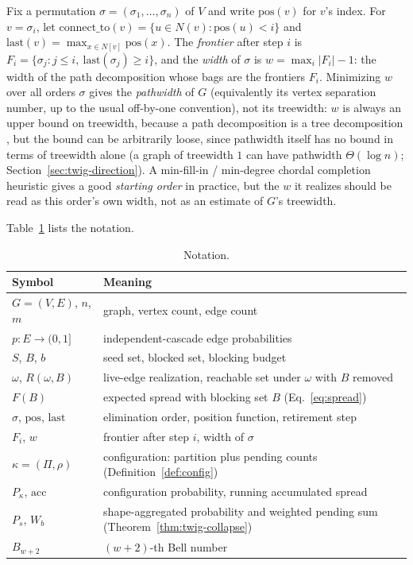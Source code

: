 \documentclass[11pt]{article}
\theoremstyle{definition}
\theoremstyle{remark}
\newcommand{\up}{\rule{0pt}{2.6ex}}
\newcommand{\down}{\rule[-1.2ex]{0pt}{0pt}}
\newcommand{\Rspread}{R}
\newcommand{\FF}{F}
\begin{document}
Fix a
permutation $\sigma=(\sigma_1,\dots,\sigma_n)$ of $V$ and write
$\mathrm{pos}(v)$ for $v$'s index. For $v=\sigma_i$, let
$\mathrm{connect\_to}(v)=\{u\in N(v):\mathrm{pos}(u)<i\}$ and
$\mathrm{last}(v)=\max_{x\in N[v]}\mathrm{pos}(x)$. The \emph{frontier}
after step $i$ is $F_i=\{\sigma_j:j\le i,\ \mathrm{last}(\sigma_j)\ge i\}$,
and the \emph{width} of $\sigma$ is $w=\max_i|F_i|-1$: the width of the path decomposition whose bags are the frontiers $F_i$. Minimizing $w$ over all orders $\sigma$
gives the \emph{pathwidth} of $G$ \citep{kinnersley1992} (equivalently its vertex separation number, up to the usual off-by-one convention), not its
treewidth: $w$ is always an upper bound on treewidth, because a path decomposition is a tree decomposition
\citep{bodlaender1988,cygan2015}, but the bound can be arbitrarily loose,
since pathwidth itself has no bound in terms of treewidth alone (a graph
of treewidth $1$ can have pathwidth $\Theta(\log n)$;
Section~\ref{sec:twig-direction}). A min-fill-in / min-degree chordal
completion heuristic \citep{bodlaender1988,cygan2015} gives a good
\emph{starting order} in practice, but the $w$ it realizes should be read
as this order's own width, not as an estimate of $G$'s treewidth.

Table~\ref{tab:notation} lists the notation.

\begin{table}[h]
\centering
\caption{Notation.}\label{tab:notation}
\small
\begin{tabular}{@{}ll@{}}
\hline
\up Symbol & Meaning \\
\hline
\up $G=(V,E)$, $n$, $m$ & graph, vertex count, edge count \\
$p:E\to(0,1]$ & independent-cascade edge probabilities \\
$S$, $B$, $b$ & seed set, blocked set, blocking budget \\
$\omega$, $\Rspread(\omega,B)$ & live-edge realization, reachable set under $\omega$ with $B$ removed \\
$\FF(B)$ & expected spread with blocking set $B$ (Eq.~\ref{eq:spread}) \\
$\sigma$, $\mathrm{pos}$, $\mathrm{last}$ & elimination order, position function, retirement step \\
$F_i$, $w$ & frontier after step $i$, width of $\sigma$ \\
$\kappa=(\Pi,\rho)$ & configuration: partition plus pending counts (Definition~\ref{def:config}) \\
$P_\kappa$, $\mathrm{acc}$ & configuration probability, running accumulated spread \\
$P_s$, $W_b$ & shape-aggregated probability and weighted pending sum (Theorem~\ref{thm:twig-collapse}) \\
\down $B_{w+2}$ & $(w+2)$-th Bell number \\
\hline
\end{tabular}
\end{table}
\end{document}
